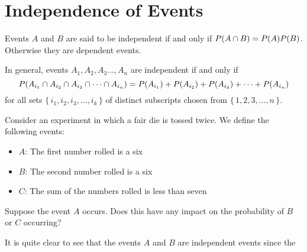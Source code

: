 \section{Independence of Events}
Events $A$ and $B$ are said to be independent if and only if $P(A \cap B) = P(A)P(B)$. Otherwise they are dependent events.
\par\smallskip
In general, events $A_1,A_2,A_3\ldots,A_n$ are independent if and only if 
\[
    P(A_{i_1} \cap A_{i_2} \cap A_{i_3} \cap \cdots \cap A_{i_n}) = P(A_{i_1}) + P(A_{i_2}) + P(A_{i_3}) + \cdots + P(A_{i_n})
\]
for all sets $\{\, i_1,i_2,i_3,\ldots,i_k \,\}$ of distinct subscripts chosen from $\{\, 1,2,3,\ldots,n \,\}$.
\begin{example}
Consider an experiment in which a fair die is tossed twice. We define the following events:
\begin{itemize}[noitemsep, topsep=4pt plus 2pt minus 1pt]
    \item $A$: The first number rolled is a six
    \item $B$: The second number rolled is a six
    \item $C$: The sum of the numbers rolled is less than seven
\end{itemize}
Suppose the event $A$ occurs. Does this have any impact on the probability of $B$ or $C$ occurring?
\par\smallskip
It is quite clear to see that the events $A$ and $B$ are independent events since the 
\end{example}